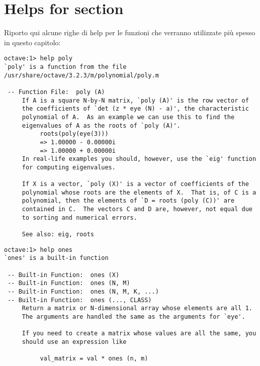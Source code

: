 \section{Helps for  section}

Riporto qui alcune righe di help per le funzioni che verranno utilizzate 
pi\`u spesso in questo capitolo:

\begin{lstlisting}
octave:1> help poly
`poly' is a function from the file /usr/share/octave/3.2.3/m/polynomial/poly.m

 -- Function File:  poly (A)
     If A is a square N-by-N matrix, `poly (A)' is the row vector of
     the coefficients of `det (z * eye (N) - a)', the characteristic
     polynomial of A.  As an example we can use this to find the
     eigenvalues of A as the roots of `poly (A)'.
          roots(poly(eye(3)))
          => 1.00000 - 0.00000i
          => 1.00000 + 0.00000i
     In real-life examples you should, however, use the `eig' function
     for computing eigenvalues.

     If X is a vector, `poly (X)' is a vector of coefficients of the
     polynomial whose roots are the elements of X.  That is, of C is a
     polynomial, then the elements of `D = roots (poly (C))' are
     contained in C.  The vectors C and D are, however, not equal due
     to sorting and numerical errors.

     See also: eig, roots
\end{lstlisting}

\begin{lstlisting}
octave:1> help ones
`ones' is a built-in function

 -- Built-in Function:  ones (X)
 -- Built-in Function:  ones (N, M)
 -- Built-in Function:  ones (N, M, K, ...)
 -- Built-in Function:  ones (..., CLASS)
     Return a matrix or N-dimensional array whose elements are all 1.
     The arguments are handled the same as the arguments for `eye'.

     If you need to create a matrix whose values are all the same, you
     should use an expression like

          val_matrix = val * ones (n, m)
\end{lstlisting}

